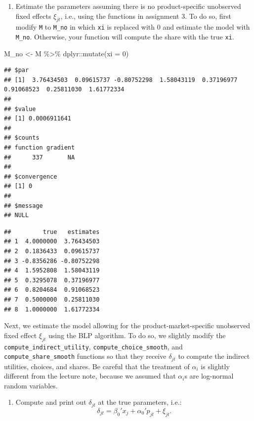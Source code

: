 \documentclass[
]{book}
\newenvironment{Shaded}{\begin{snugshade}}{\end{snugshade}}
\newcommand{\AttributeTok}[1]{\textcolor[rgb]{0.77,0.63,0.00}{#1}}
\newcommand{\DecValTok}[1]{\textcolor[rgb]{0.00,0.00,0.81}{#1}}
\newcommand{\FunctionTok}[1]{\textcolor[rgb]{0.00,0.00,0.00}{#1}}
\newcommand{\NormalTok}[1]{#1}
\newcommand{\OtherTok}[1]{\textcolor[rgb]{0.56,0.35,0.01}{#1}}
\newcommand{\SpecialCharTok}[1]{\textcolor[rgb]{0.00,0.00,0.00}{#1}}
\providecommand{\tightlist}{%
  \setlength{\itemsep}{0pt}\setlength{\parskip}{0pt}}
\begin{document}
\begin{enumerate}
\def\labelenumi{\arabic{enumi}.}
\setcounter{enumi}{2}
\tightlist
\item
  Estimate the parameters assuming there is no product-specific unobserved fixed effects \(\xi_{jt}\), i.e., using the functions in assignment 3. To do so, first modify \texttt{M} to \texttt{M\_no} in which \texttt{xi} is replaced with 0 and estimate the model with \texttt{M\_no}. Otherwise, your function will compute the share with the true \texttt{xi}.
\end{enumerate}

\begin{Shaded}
\begin{Highlighting}[]
\NormalTok{M\_no }\OtherTok{\textless{}{-}}\NormalTok{ M }\SpecialCharTok{\%\textgreater{}\%}
\NormalTok{  dplyr}\SpecialCharTok{::}\FunctionTok{mutate}\NormalTok{(}\AttributeTok{xi =} \DecValTok{0}\NormalTok{)}
\end{Highlighting}
\end{Shaded}

\begin{verbatim}
## $par
## [1]  3.76434503  0.09615737 -0.80752298  1.58043119  0.37196977  0.91068523  0.25811030  1.61772334
## 
## $value
## [1] 0.0006911641
## 
## $counts
## function gradient 
##      337       NA 
## 
## $convergence
## [1] 0
## 
## $message
## NULL
\end{verbatim}

\begin{verbatim}
##         true   estimates
## 1  4.0000000  3.76434503
## 2  0.1836433  0.09615737
## 3 -0.8356286 -0.80752298
## 4  1.5952808  1.58043119
## 5  0.3295078  0.37196977
## 6  0.8204684  0.91068523
## 7  0.5000000  0.25811030
## 8  1.0000000  1.61772334
\end{verbatim}

Next, we estimate the model allowing for the product-market-specific unobserved fixed effect \(\xi_{jt}\) using the BLP algorithm. To do so, we slightly modify the \texttt{compute\_indirect\_utility}, \texttt{compute\_choice\_smooth}, and \texttt{compute\_share\_smooth} functions so that they receive \(\delta_{jt}\) to compute the indirect utilities, choices, and shares. Be careful that the treatment of \(\alpha_i\) is slightly different from the lecture note, because we assumed that \(\alpha_i\)s are log-normal random variables.

\begin{enumerate}
\def\labelenumi{\arabic{enumi}.}
\setcounter{enumi}{3}
\tightlist
\item
  Compute and print out \(\delta_{jt}\) at the true parameters, i.e.:
  \[
  \delta_{jt} = \beta_0' x_j + \alpha_0' p_{jt} + \xi_{jt}.
  \]
\end{enumerate}
\end{document}
